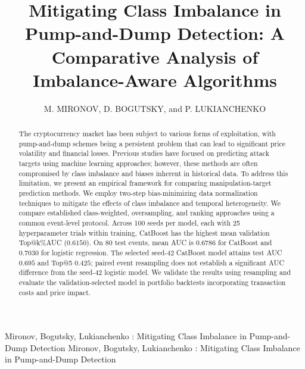 \documentclass{ieeeaccess}
\begin{document}

\title{Mitigating Class Imbalance in Pump-and-Dump Detection: A Comparative Analysis of Imbalance-Aware Algorithms}
\author{\uppercase{M. Mironov},
\uppercase{D. Bogutsky}, and P. \uppercase{Lukianchenko}}

\address[1]{National Research University Higher School of Economics, Faculty of Computer Science, Laboratory of AI in Mathematical Finance (e-mail: mvmironov@hse.ru)}

\address[2]{National Research University Higher School of Economics, Faculty of Computer Science, Laboratory of AI in Mathematical Finance (e-mail: dbogucki@hse.ru)}

\address[3]{National Research University Higher School of Economics, Faculty of Computer Science, Laboratory of AI in Mathematical Finance (e-mail: plukyanchenko@hse.ru)}


\markboth
{Mironov, Bogutsky, Lukianchenko \headeretal: Mitigating Class Imbalance in Pump-and-Dump Detection}
{Mironov, Bogutsky, Lukianchenko \headeretal: Mitigating Class Imbalance in Pump-and-Dump Detection}


\begin{abstract}
The cryptocurrency market has been subject to various forms of exploitation, with pump-and-dump schemes being a persistent problem that can lead to significant price volatility and financial losses. Previous studies have focused on predicting attack targets using machine learning approaches; however, these methods are often compromised by class imbalance and biases inherent in historical data. To address this limitation, we present an empirical framework for comparing manipulation-target prediction methods.
We employ two-step bias-minimizing data normalization techniques to mitigate the effects of class imbalance and temporal heterogeneity. We compare established class-weighted, oversampling, and ranking approaches using a common event-level protocol.
Across 100 seeds per model, each with 25 hyperparameter trials within training, CatBoost has the highest mean validation Top@k\%AUC ($0.6150$). On 80 test events, mean AUC is $0.6786$ for CatBoost and $0.7030$ for logistic regression. The selected seed-42 CatBoost model attains test AUC $0.695$ and Top@5 $0.425$; paired event resampling does not establish a significant AUC difference from the seed-42 logistic model.
We validate the results using resampling and evaluate the validation-selected model in portfolio backtests incorporating transaction costs and price impact.
\end{abstract}
\end{document}
